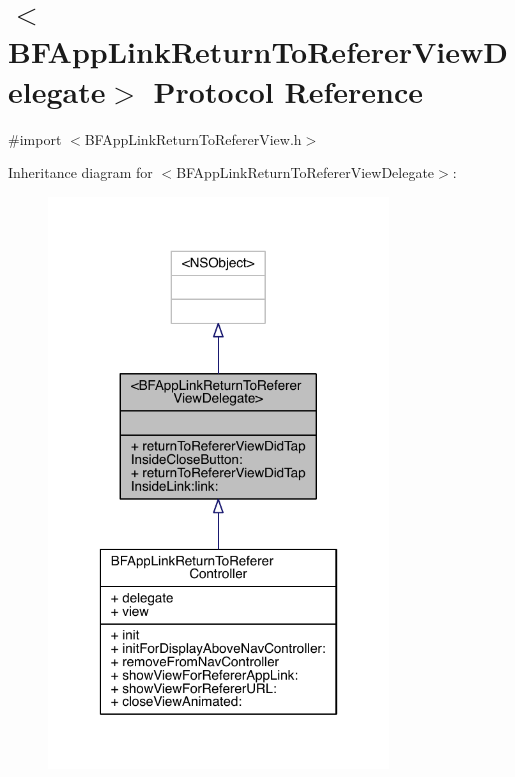 \hypertarget{protocol_b_f_app_link_return_to_referer_view_delegate-p}{\section{$<$B\-F\-App\-Link\-Return\-To\-Referer\-View\-Delegate$>$ Protocol Reference}
\label{protocol_b_f_app_link_return_to_referer_view_delegate-p}
}


{\ttfamily \#import $<$B\-F\-App\-Link\-Return\-To\-Referer\-View.\-h$>$}



Inheritance diagram for $<$B\-F\-App\-Link\-Return\-To\-Referer\-View\-Delegate$>$\-:
\nopagebreak
\begin{figure}[H]
\begin{center}
\leavevmode
\includegraphics[width=256pt]{protocol_b_f_app_link_return_to_referer_view_delegate-p__inherit__graph}
\end{center}
\end{figure}


